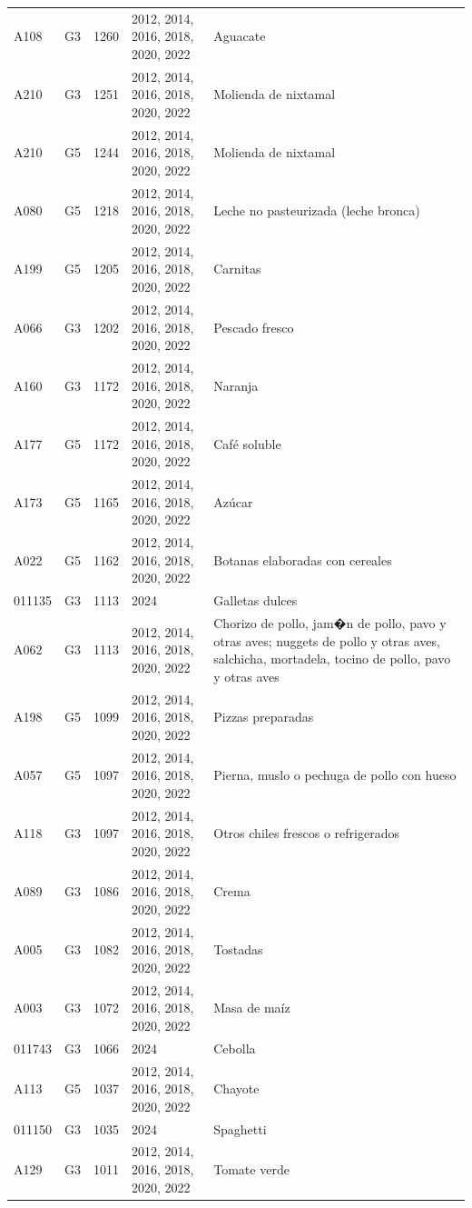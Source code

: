 \begin{table}[ht]
\begin{tabular}{llrll}
  A108 & G3 & 1260 & 2012, 2014, 2016, 2018, 2020, 2022 & Aguacate \\ 
  A210 & G3 & 1251 & 2012, 2014, 2016, 2018, 2020, 2022 & Molienda de nixtamal \\ 
  A210 & G5 & 1244 & 2012, 2014, 2016, 2018, 2020, 2022 & Molienda de nixtamal \\ 
  A080 & G5 & 1218 & 2012, 2014, 2016, 2018, 2020, 2022 & Leche no pasteurizada (leche bronca) \\ 
  A199 & G5 & 1205 & 2012, 2014, 2016, 2018, 2020, 2022 & Carnitas \\ 
  A066 & G3 & 1202 & 2012, 2014, 2016, 2018, 2020, 2022 & Pescado fresco \\ 
  A160 & G3 & 1172 & 2012, 2014, 2016, 2018, 2020, 2022 & Naranja \\ 
  A177 & G5 & 1172 & 2012, 2014, 2016, 2018, 2020, 2022 & Café soluble \\ 
  A173 & G5 & 1165 & 2012, 2014, 2016, 2018, 2020, 2022 & Azúcar \\ 
  A022 & G5 & 1162 & 2012, 2014, 2016, 2018, 2020, 2022 & Botanas elaboradas con cereales \\ 
  011135 & G3 & 1113 & 2024 & Galletas dulces \\ 
  A062 & G3 & 1113 & 2012, 2014, 2016, 2018, 2020, 2022 & Chorizo de pollo, jam�n de pollo, pavo y otras aves; nuggets de pollo y otras aves, salchicha, mortadela, tocino de pollo, pavo y otras aves \\ 
  A198 & G5 & 1099 & 2012, 2014, 2016, 2018, 2020, 2022 & Pizzas preparadas \\ 
  A057 & G5 & 1097 & 2012, 2014, 2016, 2018, 2020, 2022 & Pierna, muslo o pechuga de pollo con hueso \\ 
  A118 & G3 & 1097 & 2012, 2014, 2016, 2018, 2020, 2022 & Otros chiles frescos o refrigerados \\ 
  A089 & G3 & 1086 & 2012, 2014, 2016, 2018, 2020, 2022 & Crema \\ 
  A005 & G3 & 1082 & 2012, 2014, 2016, 2018, 2020, 2022 & Tostadas \\ 
  A003 & G3 & 1072 & 2012, 2014, 2016, 2018, 2020, 2022 & Masa de maíz \\ 
  011743 & G3 & 1066 & 2024 & Cebolla \\ 
  A113 & G5 & 1037 & 2012, 2014, 2016, 2018, 2020, 2022 & Chayote \\ 
  011150 & G3 & 1035 & 2024 & Spaghetti \\ 
  A129 & G3 & 1011 & 2012, 2014, 2016, 2018, 2020, 2022 & Tomate verde \\ 

\end{tabular}
\end{table}
